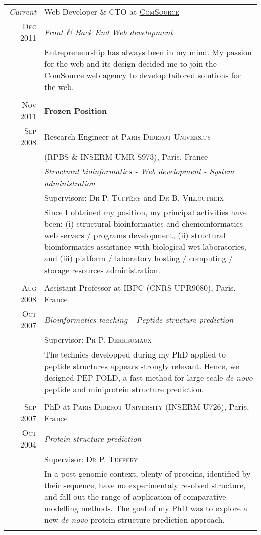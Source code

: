 \documentclass[a4paper,10pt]{article}
\begin{document}
\begin{longtable}{r|p{11cm}}

  \emph{Current} & Web Developer \& CTO at \textsc{\href{http://comsource.fr}{ComSource}} \\
  \textsc{Dec 2011}  & \emph{Front \& Back End Web development}\\
  & \footnotesize{Entrepreneurship has always been in my mind. My passion for the web and its design decided me to join the ComSource web agency to develop tailored solutions for the web.}\\
  \multicolumn{2}{c}{} \\

  \textsc{Nov 2011} & \textbf{Frozen Position} \\
  \textsc{Sep 2008} & Research Engineer at \textsc{Paris Diderot University} \\
  & (RPBS \& INSERM UMR-S973), Paris, France \\
  & \emph{Structural bioinformatics - Web development - System administration}\\
  & Supervisors: \textsc{Dr P. Tufféry} and \textsc{Dr B. Villoutreix}\\
  & \footnotesize{Since I obtained my position, my principal activities have been: (i) structural bioinformatics and chemoinformatics web servers / programs development, (ii) structural bioinformatics assistance with biological wet laboratories, and (iii) platform / laboratory hosting / computing / storage resources administration.  }\\
  \multicolumn{2}{c}{} \\

  \textsc{Aug 2008} & Assistant Professor at \textsc{IBPC} (CNRS UPR9080), Paris, France \\
  \textsc{Oct 2007} & \emph{Bioinformatics teaching - Peptide structure prediction}\\
  & Supervisor: \textsc{Pr P. Derreumaux}\\
  & \footnotesize{The technics developped during my PhD applied to peptide structures appears strongly relevant. Hence, we designed PEP-FOLD, a fast method for large scale \textit{de novo} peptide and miniprotein structure prediction.}\\
  \multicolumn{2}{c}{} \\

\clearpage

  \textsc{Sep 2007} & PhD at \textsc{Paris Diderot University} (INSERM U726), Paris, France \\
  \textsc{Oct 2004} & \emph{Protein structure prediction}\\
  & Supervisor: \textsc{Dr P. Tufféry}\\
  & \footnotesize{In a post-genomic context, plenty of proteins, identified by their sequence, have no experimentaly resolved structure, and fall out the range of application of comparative modelling methods. The goal of my PhD was to explore a new \textit{de novo} protein structure prediction approach.}\\
  \multicolumn{2}{c}{} \\


\end{longtable}
\end{document}
